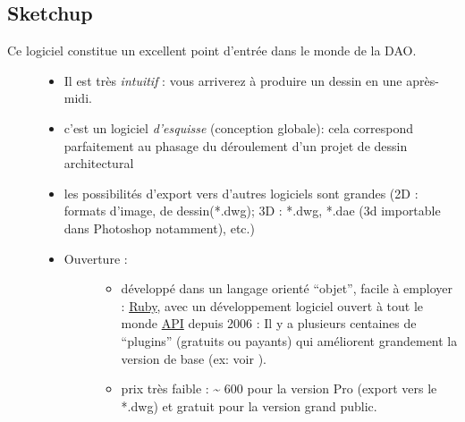 \documentclass[a4paper,12pt,french]{sphinxmanual}
\begin{document}
\subsection{Sketchup}
\label{init_su+acad/demarrage:sketchup}\begin{description}
\item[{Ce logiciel constitue un excellent point d'entrée dans le monde de la DAO.}] \leavevmode\begin{itemize}
\item {} 
Il est très \emph{intuitif} : vous arriverez à produire un dessin en une après-midi.

\item {} 
c'est un logiciel \emph{d'esquisse} (conception globale): cela correspond parfaitement au phasage du déroulement d'un projet de dessin architectural

\item {} 
les possibilités d'export vers d'autres logiciels sont grandes (2D : formats d'image, de dessin(*.dwg); 3D : *.dwg, *.dae (3d importable dans Photoshop notamment), etc.)

\item {} \begin{description}
\item[{Ouverture :}] \leavevmode\begin{itemize}
\item {} 
développé dans un langage orienté ``objet'', facile à employer : \href{http://sketchup.google.com/intl/fr/download/rubyscripts.html}{Ruby},  avec un développement logiciel ouvert à tout le monde \href{http://code.google.com/intl/fr/apis/sketchup/docs/index.html}{API} depuis 2006 : Il y a plusieurs centaines de ``plugins'' (gratuits ou payants) qui améliorent grandement la version de base (ex: voir {\hyperref[su/config\string-su:config\string-su\string-02]{}}).

\item {} 
prix très faible : \textasciitilde{} 600 \texteuro{} pour la version Pro (export vers le *.dwg) et gratuit pour la version grand public.

\end{itemize}

\end{description}

\end{itemize}

\end{description}
\end{document}
